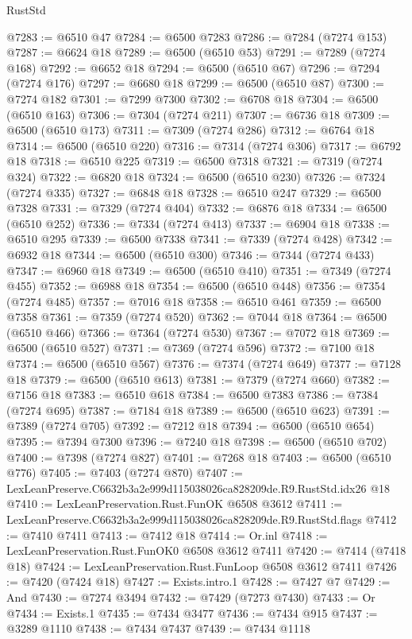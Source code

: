 \begin{lexlean}{RustStd}
\begin{coremodule}
@7283 := @6510 @47
@7284 := @6500 @7283
@7286 := @7284 (@7274 @153)
@7287 := @6624 @18
@7289 := @6500 (@6510 @53)
@7291 := @7289 (@7274 @168)
@7292 := @6652 @18
@7294 := @6500 (@6510 @67)
@7296 := @7294 (@7274 @176)
@7297 := @6680 @18
@7299 := @6500 (@6510 @87)
@7300 := @7274 @182
@7301 := @7299 @7300
@7302 := @6708 @18
@7304 := @6500 (@6510 @163)
@7306 := @7304 (@7274 @211)
@7307 := @6736 @18
@7309 := @6500 (@6510 @173)
@7311 := @7309 (@7274 @286)
@7312 := @6764 @18
@7314 := @6500 (@6510 @220)
@7316 := @7314 (@7274 @306)
@7317 := @6792 @18
@7318 := @6510 @225
@7319 := @6500 @7318
@7321 := @7319 (@7274 @324)
@7322 := @6820 @18
@7324 := @6500 (@6510 @230)
@7326 := @7324 (@7274 @335)
@7327 := @6848 @18
@7328 := @6510 @247
@7329 := @6500 @7328
@7331 := @7329 (@7274 @404)
@7332 := @6876 @18
@7334 := @6500 (@6510 @252)
@7336 := @7334 (@7274 @413)
@7337 := @6904 @18
@7338 := @6510 @295
@7339 := @6500 @7338
@7341 := @7339 (@7274 @428)
@7342 := @6932 @18
@7344 := @6500 (@6510 @300)
@7346 := @7344 (@7274 @433)
@7347 := @6960 @18
@7349 := @6500 (@6510 @410)
@7351 := @7349 (@7274 @455)
@7352 := @6988 @18
@7354 := @6500 (@6510 @448)
@7356 := @7354 (@7274 @485)
@7357 := @7016 @18
@7358 := @6510 @461
@7359 := @6500 @7358
@7361 := @7359 (@7274 @520)
@7362 := @7044 @18
@7364 := @6500 (@6510 @466)
@7366 := @7364 (@7274 @530)
@7367 := @7072 @18
@7369 := @6500 (@6510 @527)
@7371 := @7369 (@7274 @596)
@7372 := @7100 @18
@7374 := @6500 (@6510 @567)
@7376 := @7374 (@7274 @649)
@7377 := @7128 @18
@7379 := @6500 (@6510 @613)
@7381 := @7379 (@7274 @660)
@7382 := @7156 @18
@7383 := @6510 @618
@7384 := @6500 @7383
@7386 := @7384 (@7274 @695)
@7387 := @7184 @18
@7389 := @6500 (@6510 @623)
@7391 := @7389 (@7274 @705)
@7392 := @7212 @18
@7394 := @6500 (@6510 @654)
@7395 := @7394 @7300
@7396 := @7240 @18
@7398 := @6500 (@6510 @702)
@7400 := @7398 (@7274 @827)
@7401 := @7268 @18
@7403 := @6500 (@6510 @776)
@7405 := @7403 (@7274 @870)
@7407 := LexLeanPreserve.C6632b3a2e999d115038026ca828209de.R9.RustStd.idx26 @18
@7410 := LexLeanPreservation.Rust.FunOK @6508 @3612
@7411 := LexLeanPreserve.C6632b3a2e999d115038026ca828209de.R9.RustStd.flags
@7412 := @7410 @7411
@7413 := @7412 @18
@7414 := Or.inl
@7418 := LexLeanPreservation.Rust.FunOK0 @6508 @3612 @7411
@7420 := @7414 (@7418 @18)
@7424 := LexLeanPreservation.Rust.FunLoop @6508 @3612 @7411
@7426 := @7420 (@7424 @18)
@7427 := Exists.intro.{1}
@7428 := @7427 @7
@7429 := And
@7430 := @7274 @3494
@7432 := @7429 (@7273 @7430)
@7433 := Or
@7434 := Exists.{1}
@7435 := @7434 @3477
@7436 := @7434 @915
@7437 := @3289 @1110
@7438 := @7434 @7437
@7439 := @7434 @1118

\end{coremodule}
\end{lexlean}
